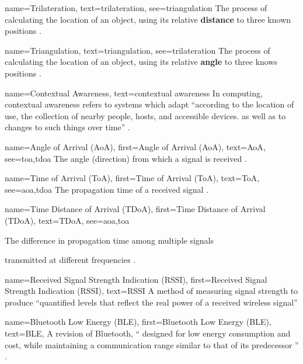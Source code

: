 \newcommand{\abbr}[1]{(#1)}

{
  name={Trilateration},
  text={trilateration},
  see={triangulation}
}
{
  The process of calculating the location of an object,
  using its relative \textbf{distance} to three known
  positions \parencite{triTri}.
}

{
  name={Triangulation},
  text={triangulation},
  see={trilateration}
}
{
  The process of calculating the location of an object,
  using its relative \textbf{angle} to three knows
  positions \parencite{triTri}.
}

{
  name={Contextual Awareness},
  text={contextual awareness}
}
{
  In computing, contextual awareness refers to systems
  which adapt \enquote{according to the location of use,
    the collection of nearby people, hosts, and accessible
    devices. as well as to changes to such things over
    time}
  \parencite{contextAware}.
}

{
  name={Angle of Arrival \abbr{AoA}},
  first={Angle of Arrival \abbr{AoA}},
  text={AoA},
  see={toa,tdoa}
}
{
  The angle (direction) from which a signal is received
  \parencite{suveryOfCellPos}.
}

{
  name={Time of Arrival \abbr{ToA}},
  first={Time of Arrival \abbr{ToA}},
  text={ToA},
  see={aoa,tdoa}
}
{
  The propagation time of a received signal
  \parencite{suveryOfCellPos}.
}

{
  name={Time Distance of Arrival \abbr{TDoA}},
  first={Time Distance of Arrival \abbr{TDoA}},
  text={TDoA},
  see={aoa,toa}
}
{
  The difference in propagation time among multiple signals

  transmitted at different frequencies
  \parencite{suveryOfCellPos}.
}

{
  name={Received Signal Strength Indication \abbr{RSSI}},
  first={Received Signal Strength Indication \abbr{RSSI}},
  text={RSSI}
}
{
  A method of measuring signal strength to produce
  \enquote{quantified levels that reflect the real power of
    a received wireless signal} \parencite{suveryOfCellPos}
}

{
  name={Bluetooth Low Energy (BLE)},
  first={Bluetooth Low Energy (BLE)},
  text={BLE},
}
{
  A revision of Bluetooth, \enquote{
    designed for low energy consumption and cost, while
    maintaining a communication range similar to that of
    its predecessor
  } \parencite{usingBluetoothBeacons}.
}


